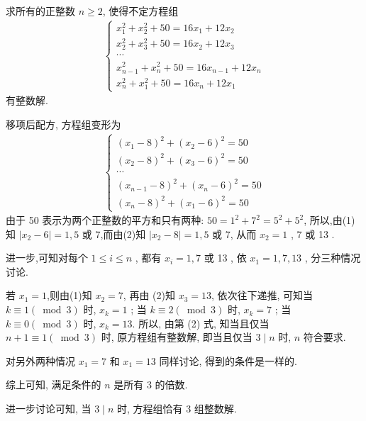 \begin{example}
	求所有的正整数 $n \geqslant 2$, 使得不定方程组
	\begin{align*}
		\left\{\begin{array}{c}
			       x_{1}^{2}+x_{2}^{2}+50=16 x_{1}+12 x_{2}     \\
			       x_{2}^{2}+x_{3}^{2}+50=16 x_{2}+12 x_{3}     \\
			       \cdots                                       \\
			       x_{n-1}^{2}+x_{n}^{2}+50=16 x_{n-1}+12 x_{n} \\
			       x_{n}^{2}+x_{1}^{2}+50=16 x_{n}+12 x_{1}
		       \end{array}\right.
	\end{align*}
	有整数解.
\end{example}
\begin{solution}
	移项后配方, 方程组变形为
	\begin{align*}
		\left\{\begin{array}{c}
			       \left(x_{1}-8\right)^{2}+\left(x_{2}-6\right)^{2}=50   \\
			       \left(x_{2}-8\right)^{2}+\left(x_{3}-6\right)^{2}=50   \\
			       \cdots                                                 \\
			       \left(x_{n-1}-8\right)^{2}+\left(x_{n}-6\right)^{2}=50 \\
			       \left(x_{n}-8\right)^{2}+\left(x_{1}-6\right)^{2}=50
		       \end{array}\right.
	\end{align*}
	由于 50 表示为两个正整数的平方和只有两种: $50=1^{2}+7^{2}=5^{2}+5^{2}$, 所以,由(1)知 $\left|x_{2}-6\right|=1 ,  5$ 或 7,而由(2)知 $\left|x_{2}-8\right|=1 ,  5$ 或 7, 从而 $x_{2}=1$ ,  7 或 13 .

	进一步,可知对每个 $1 \leqslant i \leqslant n$ , 都有 $x_{i}=1,7$ 或 13 , 依 $x_{1}=1 ,  7 ,  13$ , 分三种情况讨论.

	若 $x_{1}=1$,则由(1)知 $x_{2}=7$, 再由 (2)知 $x_{3}=13$, 依次往下递推, 可知当 $k \equiv 1(\bmod 3)$ 时,  $x_{k}=1$ ; 当 $k \equiv 2(\bmod 3)$ 时,  $x_{k}=7$ ; 当 $k \equiv 0(\bmod 3)$ 时,  $x_{k}=13$. 所以, 由第 (2) 式, 知当且仅当 $n+1 \equiv 1(\bmod 3)$ 时, 原方程组有整数解, 即当且仅当 $3 \mid n$ 时, $n$ 符合要求.

	对另外两种情况 $x_{1}=7$ 和 $x_{1}=13$ 同样讨论, 得到的条件是一样的.

	综上可知, 满足条件的 $n$ 是所有 3 的倍数.
\end{solution}
\begin{note}
	进一步讨论可知, 当 $3 \mid n$ 时, 方程组恰有 3 组整数解.
\end{note}

